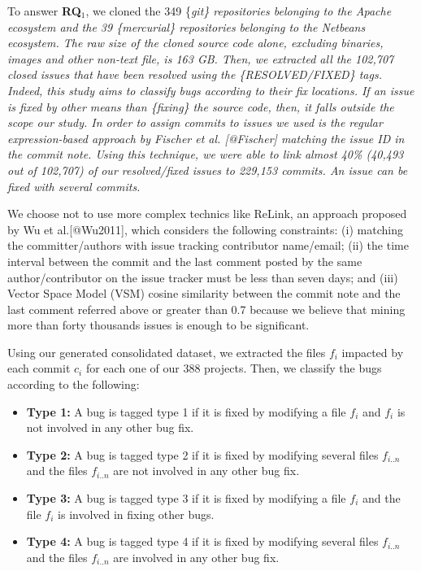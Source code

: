 To answer \textbf{RQ\(_1\)}, we cloned the 349 \{\it git\} repositories
belonging to the Apache ecosystem and the 39 \{\it mercurial\}
repositories belonging to the Netbeans ecosystem. The raw size of the
cloned source code alone, excluding binaries, images and other non-text
file, is 163 GB. Then, we extracted all the 102,707 closed issues that
have been resolved using the \{\it RESOLVED/FIXED\} tags. Indeed, this
study aims to classify bugs according to their fix locations. If an
issue is fixed by other means than \{\it fixing\} the source code, then,
it falls outside the scope our study. In order to assign commits to
issues we used is the regular expression-based approach by Fischer et
al. {[}@Fischer{]} matching the issue ID in the commit note. Using this
technique, we were able to link almost 40\% (40,493 out of 102,707) of
our resolved/fixed issues to 229,153 commits. An issue can be fixed with
several commits.

We choose not to use more complex technics like ReLink, an approach
proposed by Wu et al.{[}@Wu2011{]}, which considers the following
constraints: (i) matching the committer/authors with issue tracking
contributor name/email; (ii) the time interval between the commit and
the last comment posted by the same author/contributor on the issue
tracker must be less than seven days; and (iii) Vector Space Model (VSM)
cosine similarity between the commit note and the last comment referred
above or greater than 0.7 because we believe that mining more than forty
thousands issues is enough to be significant.

Using our generated consolidated dataset, we extracted the files \(f_i\)
impacted by each commit \(c_i\) for each one of our 388 projects. Then,
we classify the bugs according to the following:

\begin{itemize}
\tightlist
\item
  \textbf{Type 1:} A bug is tagged type 1 if it is fixed by modifying a
  file \(f_i\) and \(f_i\) is not involved in any other bug fix.
\item
  \textbf{Type 2:} A bug is tagged type 2 if it is fixed by modifying
  several files \(f_{i..n}\) and the files \(f_{i..n}\) are not involved
  in any other bug fix.
\item
  \textbf{Type 3:} A bug is tagged type 3 if it is fixed by modifying a
  file \(f_{i}\) and the file \(f_{i}\) is involved in fixing other
  bugs.
\item
  \textbf{Type 4:} A bug is tagged type 4 if it is fixed by modifying
  several files \(f_{i..n}\) and the files \(f_{i..n}\) are involved in
  any other bug fix.
\end{itemize}

